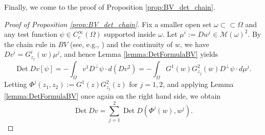 \documentclass[12pt]{article}
\newcommand{\Det}{\operatorname{Det}}
\theoremstyle{plain}
\numberwithin{equation}{section}
\begin{document}
Finally, we come to the proof of Proposition \ref{prop:BV_det_chain}.
\begin{proof}[Proof of Proposition \ref{prop:BV_det_chain}] 
    Fix a smaller open set $\omega \subset\subset \Omega$ and any test function $\psi \in C^\infty_c(\Omega)$ supported inside $\omega$. Let $\mu^i := Dw^i \in \mathcal{M}(\omega)^2$. By the chain rule in $BV$ (see, e.g., \cite[Theorem 3.96]{ambrosio_00}) and the continuity of $w$, we have $Dv^i = G^i_{z_j}(w)\mu^j$, and hence Lemma \ref{lemma:DetFormulaBV} yields
    \begin{equation*}
        \Det Dv[\psi] = -\int_\Omega v^1 D^\perp\psi \cdot d(Dv^2) = -\int_\Omega G^1(w) G^2_{z_j}(w) D^\perp \psi \cdot d\mu^j.
    \end{equation*}
    Letting $\Phi^j(z_1,z_2) := G^1(z)G^2_{z_j}(z)$ for $j=1,2$, and applying Lemma \ref{lemma:DetFormulaBV} once again on the right hand side, we obtain
    \begin{equation} \label{eq:sum_of_two_single_transforms}
        \Det Dv = \sum_{j=1}^2 \Det D(\Phi^j(w),w^j).
    \end{equation}
    

\end{proof}
\end{document}
